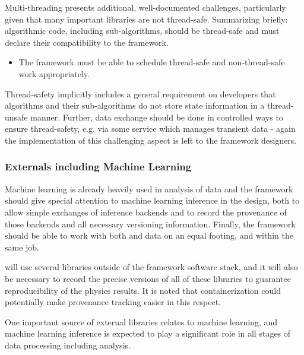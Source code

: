 \documentclass[../main-v1.tex]{subfiles}
\begin{document}
Multi-threading presents additional, well-documented challenges, particularly given that many important libraries are not thread-safe.  Summarizing briefly: algorithmic code, including sub-algorithms, should be thread-safe and must declare their compatibility to the framework.

\begin{itemize}

\item The framework must be able to schedule thread-safe and non-thread-safe work appropriately.  
\end{itemize}

Thread-safety implicitly includes a general requirement on developers that algorithms and their sub-algorithms do not store state information in a thread-unsafe manner.  Further, data exchange should be done in controlled ways to ensure thread-safety, e.g. via some service which manages transient data - again the implementation of this challenging aspect is left to the framework designers.



\subsubsection{Externals including Machine Learning}
Machine learning is already heavily used in analysis of  data and the framework should give special attention to machine learning inference in the design, both to allow simple exchanges of inference backends and to record the provenance of those backends and all necessary versioning information.  Finally, the framework should be able to work with both  and  data on an equal footing, and within the same job.

 will use several libraries outside of the framework software stack, and it will also be necessary to record the precise versions of all of these libraries to guarantee reproducibility of the physics results.  It is noted that containerization could potentially make provenance tracking easier in this respect.  



One important source of external libraries relates to machine learning, and machine learning inference is expected to play a significant role in all stages of data processing including analysis.  
\end{document}

